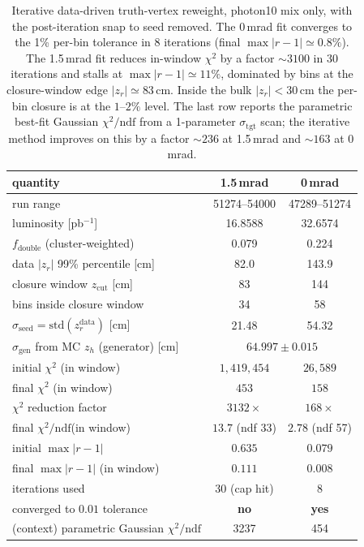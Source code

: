 \documentclass[11pt,a4paper]{article}
\newcommand{\chidf}{\ensuremath{\chi^2/\mathrm{ndf}}\xspace}
\begin{document}
\begin{table}[H]
\centering
\renewcommand{\arraystretch}{1.15}
\begin{tabular}{l c c}
\toprule
quantity & 1.5\,mrad & 0\,mrad \\
\midrule
run range                                & 51274--54000 & 47289--51274 \\
luminosity [pb$^{-1}$]                   & 16.8588      & 32.6574      \\
$f_\mathrm{double}$ (cluster-weighted)   & 0.079        & 0.224        \\
data $|z_r|$ 99\% percentile [cm]        & 82.0         & 143.9        \\
closure window $z_\mathrm{cut}$ [cm]     & 83           & 144          \\
bins inside closure window               & 34           & 58           \\
$\sigma_\mathrm{seed}=\mathrm{std}(z_r^\mathrm{data})$ [cm]  & 21.48 & 54.32 \\
$\sigma_\mathrm{gen}$ from MC $z_h$ (generator) [cm] & \multicolumn{2}{c}{$64.997 \pm 0.015$} \\
\midrule
initial $\chi^2$ (in window)             & $1{,}419{,}454$ & $26{,}589$ \\
final   $\chi^2$ (in window)             & $453$           & $158$ \\
$\chi^2$ reduction factor                & $3132\times$    & $168\times$ \\
final \chidf (in window)                 & $13.7$ (ndf 33) & $2.78$ (ndf 57) \\
initial $\max|r-1|$                      & $0.635$         & $0.079$ \\
final   $\max|r-1|$ (in window)          & $0.111$         & $0.008$ \\
iterations used                          & 30 (cap hit)    & 8 \\
converged to $0.01$ tolerance            & \textbf{no}     & \textbf{yes} \\
\midrule
(context) parametric Gaussian \chidf     & 3237            & 454 \\
\bottomrule
\end{tabular}
\caption{Iterative data-driven truth-vertex reweight, photon10 mix only,
  with the post-iteration snap to seed removed. The 0\,mrad fit
  converges to the 1\% per-bin tolerance in 8 iterations (final
  $\max|r-1|\simeq 0.8\%$). The 1.5\,mrad fit reduces in-window
  $\chi^2$ by a factor $\sim\!3100$ in 30 iterations and stalls at
  $\max|r-1|\simeq 11\%$, dominated by bins at the closure-window
  edge $|z_r|\simeq 83$\,cm. Inside the bulk $|z_r|<30$\,cm the
  per-bin closure is at the $1$--$2\%$ level. The last row reports
  the parametric best-fit Gaussian \chidf from a 1-parameter
  $\sigma_\mathrm{tgt}$ scan; the iterative method improves on this
  by a factor $\sim\!236$ at 1.5\,mrad and $\sim\!163$ at 0\,mrad.}
\label{tab:iter_summary}
\end{table}
\end{document}
